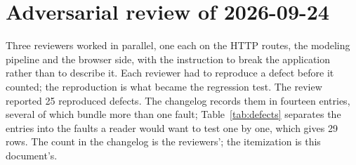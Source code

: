 \section{Adversarial review of 2026-09-24}
\label{sec:review}

Three reviewers worked in parallel, one each on the HTTP routes, the modeling pipeline and the browser side, with the instruction to break the application rather than to describe it. Each reviewer had to reproduce a defect before it counted; the reproduction is what became the regression test. The review reported 25 reproduced defects. The changelog records them in fourteen entries, several of which bundle more than one fault; Table~\ref{tab:defects} separates the entries into the faults a reader would want to test one by one, which gives 29 rows. The count in the changelog is the reviewers'; the itemization is this document's.

